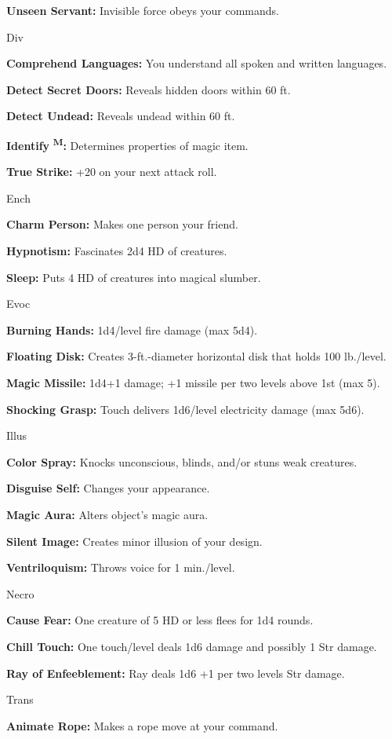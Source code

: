 \documentclass{article}
\begin{document}
\textbf{Unseen Servant:} Invisible force obeys your commands.

Div

\textbf{Comprehend Languages:} You understand all spoken and written languages.

\textbf{Detect Secret Doors:} Reveals hidden doors within 60 ft.

\textbf{Detect Undead:} Reveals undead within 60 ft.

\textbf{Identify }\textsuperscript{\textbf{M}}\textbf{:} Determines properties 
of magic item.

\textbf{True Strike:} +20 on your next attack roll.

Ench

\textbf{Charm Person: }Makes one person your friend.

\textbf{Hypnotism:} Fascinates 2d4 HD of creatures.

\textbf{Sleep:} Puts 4 HD of creatures into magical slumber.

Evoc

\textbf{Burning Hands:} 1d4/level fire damage (max 5d4).

\textbf{Floating Disk:} Creates 3-ft.-diameter horizontal disk that holds 100 lb./level.

\textbf{Magic Missile:} 1d4+1 damage; +1 missile per two levels above 1st (max 
5).

\textbf{Shocking Grasp:} Touch delivers 1d6/level electricity damage (max 5d6).

Illus

\textbf{Color Spray:} Knocks unconscious, blinds, and/or stuns weak creatures.

\textbf{Disguise Self:} Changes your appearance.

\textbf{Magic Aura:} Alters object's magic aura.

\textbf{Silent Image:} Creates minor illusion of your design.

\textbf{Ventriloquism:} Throws voice for 1 min./level.

Necro

\textbf{Cause Fear:} One creature of 5 HD or less flees for 1d4 rounds.

\textbf{Chill Touch:} One touch/level deals 1d6 damage and possibly 1 Str damage.

\textbf{Ray of Enfeeblement:} Ray deals 1d6 +1 per two levels Str damage.

Trans

\textbf{Animate Rope: }Makes a rope move at your command.
\end{document}
